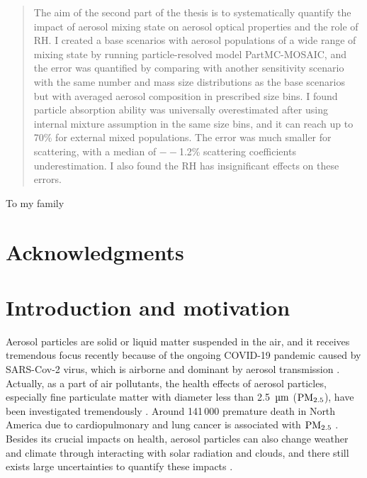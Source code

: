 \documentclass[edeposit,fullpage]{uiucthesis2009}
\begin{document}
\begin{abstract}
The aim of the second part of the thesis is to systematically quantify the impact of aerosol mixing state on aerosol optical properties and the role of RH. I created a base scenarios with aerosol populations of a wide range of mixing state by running particle-resolved model PartMC-MOSAIC, and the error was quantified by comparing with another sensitivity scenario with the same number and mass size distributions as the base scenarios but with averaged aerosol composition in prescribed size bins. I found particle absorption ability was universally overestimated after using internal mixture assumption in the same size bins, and it can reach up to 70\% for external mixed populations. The error was much smaller for scattering, with a median of $--$1.2\% scattering coefficients underestimation. I also found the RH has insignificant effects on these errors. 

\end{abstract}

\begin{dedication}
To my family
\end{dedication}

\chapter*{Acknowledgments}


%


\tableofcontents

\mainmatter


\chapter{Introduction and motivation}
\label{chapter1}
Aerosol particles are solid or liquid matter suspended in the air, and it receives tremendous focus recently because of the ongoing COVID-19 pandemic caused by SARS-Cov-2 virus, which is airborne and dominant by aerosol transmission \citep{prather2020reducing,zhang2020identifying, miller2021transmission, greenhalgh2021ten}. Actually, as a part of air pollutants, the health effects of aerosol particles, especially fine particulate matter with diameter less than 2.5~$\rm \mu m$ ($\rm PM_{2.5}$), have been investigated tremendously \citep{bell2007spatial, fann2012estimating}. Around 141\,000 premature death in North America due to cardiopulmonary and lung cancer is associated with $\rm PM_{2.5}$ \citep{anenberg2010estimate}. Besides its crucial impacts on health, aerosol particles can also change weather and climate through interacting with solar radiation and clouds, and there still exists large uncertainties to quantify these impacts \citep{IPCC_CHAPTER7, seinfeld2016improving, fan2016review, bellouin2020bounding}. 
\end{document}
